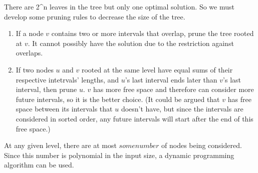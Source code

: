\documentclass[letterpaper,notitlepage,twoside]{article}
\begin{document}
There are 2^n leaves in the tree but only one optimal solution. So we must develop some pruning rules to decrease the size of the tree.
\begin{enumerate}
\item If a node $v$ contains two or more intervals that overlap, prune the tree rooted at $v$. It cannot possibly have the solution due to the restriction against overlaps.
\item If two nodes $u$ and $v$ rooted at the same level have equal sums of their respective intetrvals' lengths, and $u$'s last interval ends later than $v$'s last interval, then prune $u$. $v$ has more free space and therefore can consider more future intervals, so it is the better choice. (It could be argued that $v$ has free space between its intervals that $u$ doesn't have, but since the intervals are considered in sorted order, any future intervals will start after the end of this free space.) 
\end{enumerate}

At any given level, there are at most $some number$ of nodes being considered. Since this number is polynomial in the input size, a dynamic programming algorithm can be used.
\end{document}
